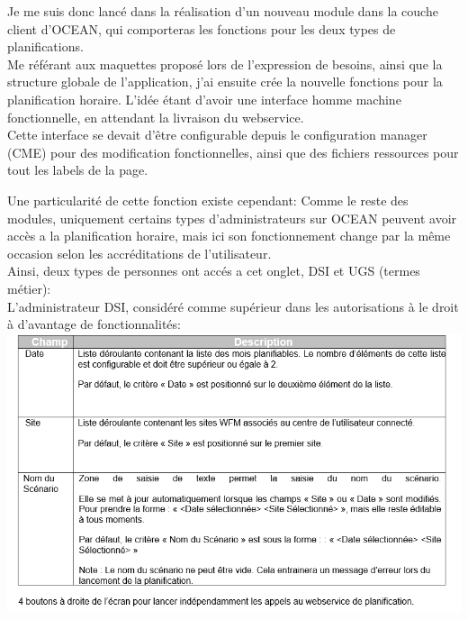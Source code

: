 \documentclass{rapport}
\begin{document}
\begin{minipage}{0.35\textwidth}
\end{minipage}
\begin{minipage}{0.55\textwidth}
Je me suis donc lancé dans la réalisation d'un nouveau module dans la couche client d'OCEAN, qui comporteras les fonctions pour les deux types de planifications.\\
Me référant aux maquettes proposé lors de l'expression de besoins, ainsi que la structure globale de l'application, j'ai ensuite crée la nouvelle fonctions pour la planification horaire. L'idée étant d'avoir une interface homme machine fonctionnelle, en attendant la livraison du webservice.\\

Cette interface se devait d'être configurable depuis le configuration manager (CME) pour des modification fonctionnelles, ainsi que des fichiers ressources pour tout les labels de la page.
\end{minipage}
\vspace{5mm} %

Une particularité de cette fonction existe cependant: Comme le reste des modules, uniquement certains types d'administrateurs sur OCEAN peuvent avoir accès a la planification horaire, mais ici son fonctionnement change par la même occasion selon les accréditations de l'utilisateur.\\
Ainsi, deux types de personnes ont accés a cet onglet, DSI et UGS (termes métier):\\

L'administrateur DSI, considéré comme supérieur dans les autorisations à le droit à d'avantage de fonctionnalités:\\
\includegraphics[width=.95\textwidth]{fig/fig18_PlanoHDSIFonct.png}
\end{document}
